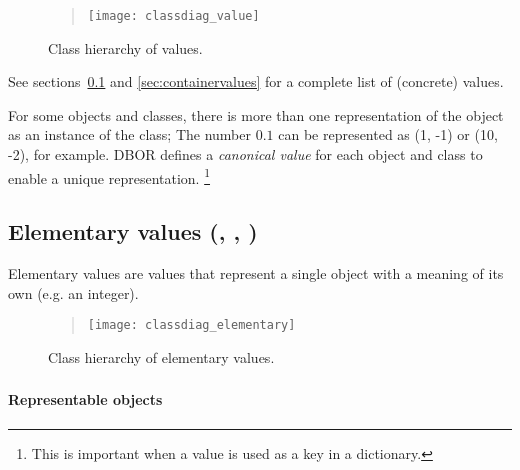 \begin{figure}[H]
    \begin{quote}
        \noindent
        \texttt{[image: classdiag\_value]}%
        \caption{Class hierarchy of values.}
        \label{fig:class:Value}
    \end{quote}
\end{figure}

See sections~\ref{sec:elementaryvalues} and \ref{sec:containervalues} for a complete list of (concrete) values.

\medskip
For some objects and classes, there is more than one representation of the object as an instance of the class;
The number $0.1$ can be represented as \DborDecimalRationalValue(1, -1) or \DborDecimalRationalValue(10, -2),
for example.
DBOR defines a \emph{canonical value} for each object and class to enable a unique representation.%
\footnote{
    This is important when a value is used as a key in a dictionary.
}


\subsection{Elementary values (\DborElementaryValue, \DborNumberValue, \DborStringValue)}
\label{sec:elementaryvalues}
\hypertarget{sec:def:ElementaryValue}{}
\hypertarget{sec:def:NumberValue}{}
\hypertarget{sec:def:StringValue}{}

Elementary values are values that represent a single object with a meaning of its own (e.g. an integer).


\begin{figure}[H]
    \begin{quote}
        \noindent
        \texttt{[image: classdiag\_elementary]}%
        \caption{Class hierarchy of elementary values.}
        \label{fig:class:ElementaryValue}
    \end{quote}
\end{figure}


\subsubsection{\DborNoneValue}
\label{sec:def:NoneValue}
\hypertarget{sec:def:NoneValue}{}

\paragraph{Representable objects}

